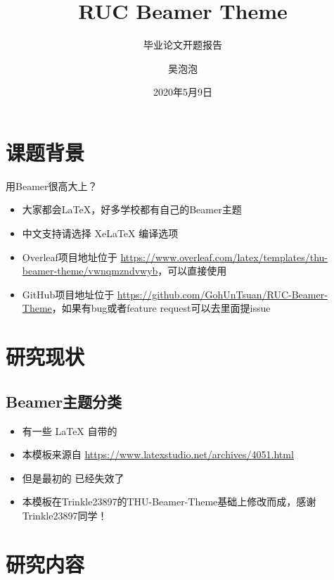 \documentclass{RucBeamer}
\author{吴泡泡}
\title{RUC Beamer Theme}
\subtitle{毕业论文开题报告}
\institute{中国人民大学国际关系学院}
\date{2020年5月9日}
\begin{document}
\ructitlepage
\ructableofcontents

\section{课题背景}

\begin{frame}{用Beamer很高大上？}
  \begin{itemize}[<+-| alert@+>] %
    \item 大家都会\LaTeX{}，好多学校都有自己的Beamer主题
    \item 中文支持请选择 Xe\LaTeX{} 编译选项
    \item Overleaf项目地址位于 \url{https://www.overleaf.com/latex/templates/thu-beamer-theme/vwnqmzndvwyb}，可以直接使用
    \item GitHub项目地址位于 \url{https://github.com/GohUnTsuan/RUC-Beamer-Theme}，如果有bug或者feature request可以去里面提issue
  \end{itemize}
\end{frame}

\section{研究现状}

\subsection{Beamer主题分类}

\begin{frame}
  \begin{itemize}
    \item 有一些 \LaTeX{} 自带的
    \item 本模板来源自 \newline \url{https://www.latexstudio.net/archives/4051.html}
    \item 但是最初的 \href{http://far.tooold.cn/post/latex/beamertsinghua}{\color{purple}{link}} \cite{origin}已经失效了
    \item 本模板在Trinkle23897的THU-Beamer-Theme基础上修改而成，感谢Trinkle23897同学！\href{https://github.com/Trinkle23897/THU-Beamer-Theme}{\color{red}{戳我}}
  \end{itemize}
\end{frame}

\section{研究内容}
\end{document}
